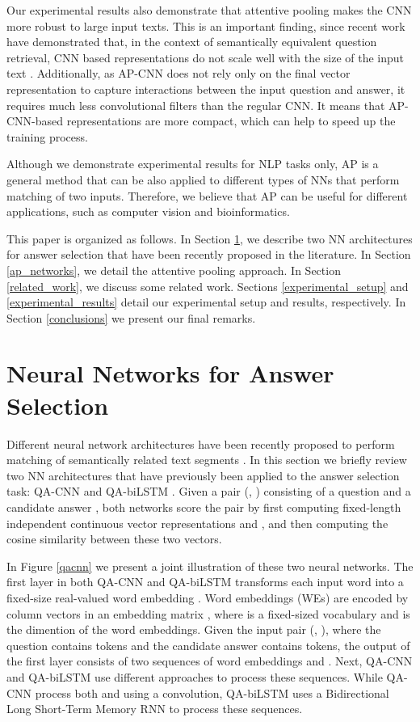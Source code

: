 \documentclass{article}
\begin{document}
Our experimental results also demonstrate that attentive pooling makes the CNN more robust to large input texts.
This is an important finding,
since recent work have demonstrated that,
in the context of semantically equivalent question retrieval,
CNN based representations do not scale well with the size of the input text \cite{dos2015learning}.
Additionally,
as AP-CNN does not rely only on the final vector representation to capture interactions between the input question and answer,
it requires much less convolutional filters than the regular CNN. It means that AP-CNN-based representations are more compact,
which can help to speed up the training process.

Although we demonstrate experimental results for NLP tasks only, 
AP is a general method that can be also applied to different types of NNs that perform matching of two inputs.
Therefore,
we believe that AP can be useful for different applications, such as computer vision and bioinformatics.

This paper is organized as follows. 
In Section \ref{neural_nets}, 
we describe two NN architectures for answer selection that have been recently proposed in the literature. 
In Section \ref{ap_networks}, 
we detail the attentive pooling approach.
In Section \ref{related_work}, 
we discuss some related work. 
Sections \ref{experimental_setup} and \ref{experimental_results} detail our experimental setup and results, respectively. 
In Section \ref{conclusions} we present our final remarks.
 \section{Neural Networks for Answer Selection}
\label{neural_nets}
Different neural network architectures have  been recently proposed to perform matching of semantically related text segments \cite{yu2014,hu2014,dos2015learning,wang2015,severyn2015,tan:Arxiv15}.
In this section we briefly review two NN architectures that have previously been applied to the answer selection task:
QA-CNN \cite{feng2015applying} and QA-biLSTM \cite{tan:Arxiv15}.
Given a pair (, ) consisting of a question  and a candidate answer ,
both networks score the pair by first computing fixed-length independent continuous vector representations  and ,
and then computing the cosine similarity between these two vectors.

In Figure \ref{qacnn}
we present a joint illustration of these two neural networks.
The first layer in both QA-CNN and QA-biLSTM transforms each input word  into a fixed-size real-valued word embedding .
Word embeddings (WEs) are encoded by column vectors in an embedding matrix ,
where  is a fixed-sized vocabulary
and  is the dimention of the word embeddings.
Given the input pair (, ),
where the question  contains  tokens and the candidate answer  contains  tokens,
the output of the first layer consists of two sequences of word embeddings  and .
Next,
QA-CNN and QA-biLSTM use different approaches to process these sequences.
While QA-CNN process both  and  using a convolution,
QA-biLSTM uses a Bidirectional Long Short-Term Memory RNN \cite{lstm1997} to process these sequences.
\end{document}
